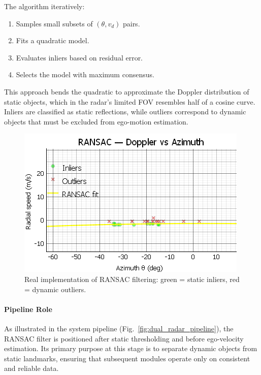 The algorithm iteratively:
\begin{enumerate}
    \item Samples small subsets of $(\theta, v_d)$ pairs.
    \item Fits a quadratic model.
    \item Evaluates inliers based on residual error.
    \item Selects the model with maximum consensus.
\end{enumerate}

This approach bends the quadratic to approximate the Doppler distribution of static objects, which in the radar's limited FOV resembles half of a cosine curve.  
Inliers are classified as static reflections, while outliers correspond to dynamic objects that must be excluded from ego-motion estimation.

\begin{figure}[!htbp]
    \centering
    \includegraphics[width=0.9\linewidth]{images/RANSAC_movingTarget_wPtCloud.png}
    \caption{Real implementation of RANSAC filtering: green = static inliers, red = dynamic outliers.}
    \label{fig:ransac_real_static_dynamic}
\end{figure}

\paragraph{Pipeline Role}
As illustrated in the system pipeline (Fig.~\ref{fig:dual_radar_pipeline}), the RANSAC filter is positioned after static thresholding and before ego-velocity estimation.  
Its primary purpose at this stage is to separate dynamic objects from static landmarks, ensuring that subsequent modules operate only on consistent and reliable data.  

